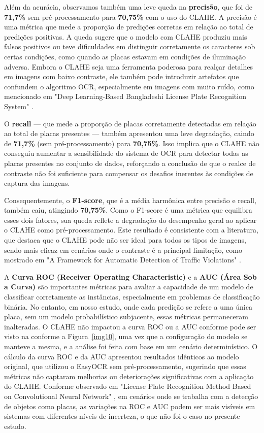 \documentclass[conference]{IEEEtran}
\begin{document}
Além da acurácia, observamos também uma leve queda na \textbf{precisão}, que foi de \textbf{71,7\%} sem pré-processamento para \textbf{70,75\%} com o uso do CLAHE. A precisão é uma métrica que mede a proporção de predições corretas em relação ao total de predições positivas. A queda sugere que o modelo com CLAHE produziu mais falsos positivos ou teve dificuldades em distinguir corretamente os caracteres sob certas condições, como quando as placas estavam em condições de iluminação adversa. Embora o CLAHE seja uma ferramenta poderosa para realçar detalhes em imagens com baixo contraste, ele também pode introduzir artefatos que confundem o algoritmo OCR, especialmente em imagens com muito ruído, como mencionado em "Deep Learning-Based Bangladeshi License Plate Recognition System" \cite{b11}.

O \textbf{recall} — que mede a proporção de placas corretamente detectadas em relação ao total de placas presentes — também apresentou uma leve degradação, caindo de \textbf{71,7\%} (sem pré-processamento) para \textbf{70,75\%}. Isso implica que o CLAHE não conseguiu aumentar a sensibilidade do sistema de OCR para detectar todas as placas presentes no conjunto de dados, reforçando a conclusão de que o realce de contraste não foi suficiente para compensar os desafios inerentes às condições de captura das imagens.

Consequentemente, o \textbf{F1-score}, que é a média harmônica entre precisão e recall, também caiu, atingindo \textbf{70,75\%}. Como o F1-score é uma métrica que equilibra esses dois fatores, sua queda reflete a degradação do desempenho geral ao aplicar o CLAHE como pré-processamento. Este resultado é consistente com a literatura, que destaca que o CLAHE pode não ser ideal para todos os tipos de imagens, sendo mais eficaz em cenários onde o contraste é a principal limitação, como mostrado em "A Framework for Automatic Detection of Traffic Violations" \cite{b12}.


A \textbf{Curva ROC (Receiver Operating Characteristic)} e a \textbf{AUC (Área Sob a Curva)} são importantes métricas para avaliar a capacidade de um modelo de classificar corretamente as instâncias, especialmente em problemas de classificação binária. No entanto, em nosso estudo, onde cada predição se refere a uma única placa, sem um modelo probabilístico subjacente, essas métricas permaneceram inalteradas. O CLAHE não impactou a curva ROC ou a AUC conforme pode ser visto na conforme a Figura~\ref{img10}, uma vez que a configuração do modelo se manteve a mesma, e a análise foi feita com base em um cenário determinístico. O cálculo da curva ROC e da AUC apresentou resultados idênticos ao modelo original, que utilizou o EasyOCR sem pré-processamento, sugerindo que essas métricas não captaram melhorias ou deteriorações significativas com a aplicação do CLAHE. Conforme observado em "License Plate Recognition Method Based on Convolutional Neural Network" \cite{b14}, em cenários onde se trabalha com a detecção de objetos como placas, as variações na ROC e AUC podem ser mais visíveis em sistemas com diferentes níveis de incerteza, o que não foi o caso no presente estudo.
\end{document}

